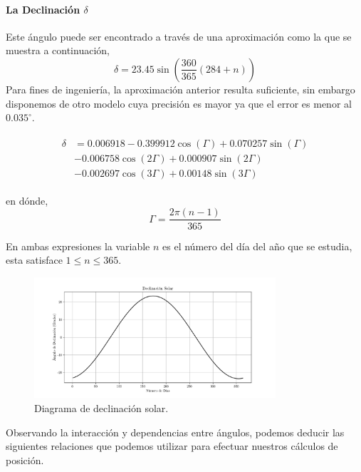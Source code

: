 \paragraph{La Declinación $\delta$}
Este ángulo puede ser encontrado a través de una aproximación como la que se muestra a continuación,
\begin{equation} \label{eq:declinacion_ingenieria}
\delta = 23.45 \sin\left( \frac{360}{365}\left( 284 + n\right) \right) 
\end{equation}
Para fines de ingeniería, la aproximación anterior resulta suficiente, sin embargo disponemos de otro modelo cuya precisión es mayor ya que el error es menor al $0.035^\circ$.

\begin{align} \label{eq:declinacion_precisa}
	\begin{aligned}
		\delta & = 0.006918 - 0.399912\cos\left(\Gamma \right) + 0.070257\sin(\Gamma) \\
		& -0.006758\cos\left(2\Gamma \right)  + 0.000907\sin\left(2\Gamma \right)  \\
		& -0.002697\cos\left(3\Gamma \right) + 0.00148\sin\left(3\Gamma \right)
	\end{aligned}
\end{align}

en dónde,
\begin{equation}
\Gamma = \frac{2\pi\left(n-1 \right) }{365}
\end{equation}

En ambas expresiones la variable $n$ es el número del día del año que se estudia, esta satisface $1\leq n \leq 365$.

\begin{figure}[htbp]
	\centering
	\includegraphics[width=0.8\textwidth, angle=0]{images/solardeclination.pdf}
	\caption{Diagrama de declinación solar.}
\end{figure}

Observando la interacción y dependencias entre ángulos, podemos deducir las siguientes relaciones que podemos utilizar para efectuar nuestros cálculos de posición.

